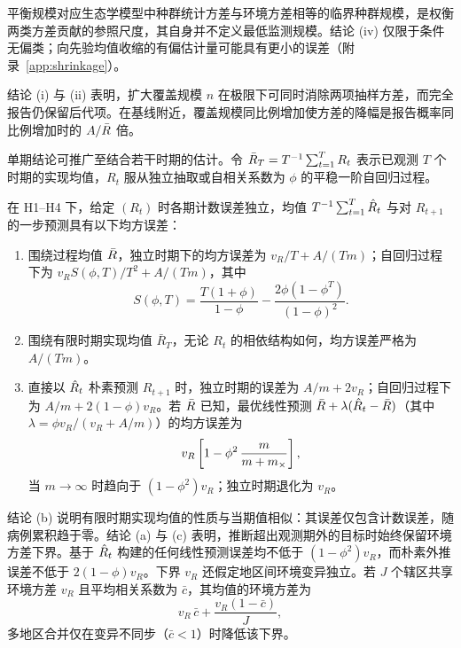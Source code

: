 平衡规模对应生态学模型中种群统计方差与环境方差相等的临界种群规模\citep{lande1993risks, lande2003stochastic}，是权衡两类方差贡献的参照尺度，其自身并不定义最低监测规模。结论 (iv) 仅限于条件无偏类；向先验均值收缩的有偏估计量可能具有更小的误差（附录~\ref{app:shrinkage}）。

结论 (i) 与 (ii) 表明，扩大覆盖规模 $n$ 在极限下可同时消除两项抽样方差，而完全报告仍保留后代项。在基线附近，覆盖规模同比例增加使方差的降幅是报告概率同比例增加时的 $A/\bar{R}$ 倍。

单期结论可推广至结合若干时期的估计。令 $\bar{R}_T=T^{-1}\sum_{t=1}^T R_t$ 表示已观测 $T$ 个时期的实现均值，$R_t$ 服从独立抽取或自相关系数为 $\phi$ 的平稳一阶自回归过程。

\begin{corollary}[跨越若干时期的三类目标]
\label{cor:targets}
在 H1--H4 下，给定 $(R_t)$ 时各期计数误差独立，均值 $T^{-1}\sum_{t=1}^T\hat{R}_t$ 与对 $R_{t+1}$ 的一步预测具有以下均方误差：
\begin{enumerate}[label=(\alph*),leftmargin=2em]
  \item 围绕过程均值 $\bar{R}$，独立时期下的均方误差为 $v_R/T+A/(Tm)$；自回归过程下为 $v_RS(\phi,T)/T^2+A/(Tm)$，其中
  \begin{equation}
    S(\phi,T)=\frac{T(1+\phi)}{1-\phi}-\frac{2\phi(1-\phi^T)}{(1-\phi)^2}.
    \label{eq:ar-sum}
  \end{equation}
  \item 围绕有限时期实现均值 $\bar{R}_T$，无论 $R_t$ 的相依结构如何，均方误差严格为 $A/(Tm)$。
  \item 直接以 $\hat{R}_t$ 朴素预测 $R_{t+1}$ 时，独立时期的误差为 $A/m+2v_R$；自回归过程下为 $A/m+2(1-\phi)v_R$。若 $\bar{R}$ 已知，最优线性预测 $\bar{R}+\lambda(\hat{R}_t-\bar{R})$（其中 $\lambda=\phi v_R/(v_R+A/m)$）的均方误差为
  \begin{equation}
    v_R\left[1-\phi^2\,\frac{m}{m+m_{\times}}\right],
    \label{eq:forecast}
  \end{equation}
  当 $m\to\infty$ 时趋向于 $(1-\phi^2)v_R$；独立时期退化为 $v_R$。
\end{enumerate}
\end{corollary}

结论 (b) 说明有限时期实现均值的性质与当期值相似：其误差仅包含计数误差，随病例累积趋于零。结论 (a) 与 (c) 表明，推断超出观测期外的目标时始终保留环境方差下界。基于 $\hat{R}_t$ 构建的任何线性预测误差均不低于 $(1-\phi^2)v_R$，而朴素外推误差不低于 $2(1-\phi)v_R$。下界 $v_R$ 还假定地区间环境变异独立。若 $J$ 个辖区共享环境方差 $v_R$ 且平均相关系数为 $\bar{c}$，其均值的环境方差为
\begin{equation}
  v_R\,\bar{c}+\frac{v_R(1-\bar{c})}{J},
  \label{eq:pooling}
\end{equation}
多地区合并仅在变异不同步（$\bar{c}<1$）时降低该下界。

